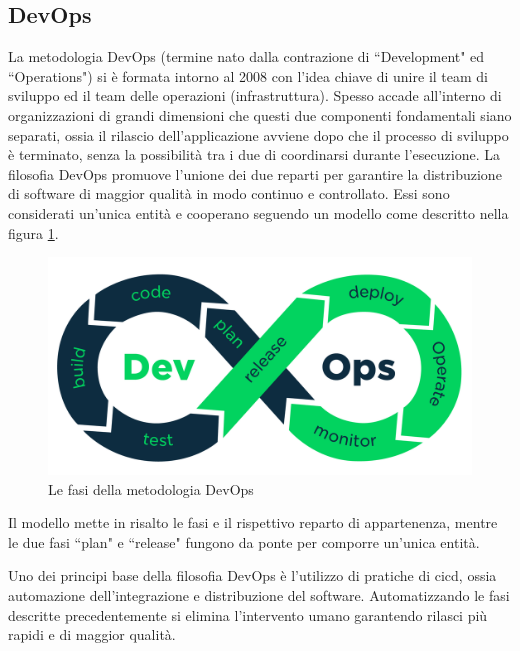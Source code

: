 \subsection{DevOps}
La metodologia DevOps (termine nato dalla contrazione di ``Development" ed ``Operations") si è formata intorno al 2008 con l'idea chiave di unire il team di sviluppo ed il team delle operazioni (infrastruttura). Spesso accade all'interno di organizzazioni di grandi dimensioni che questi due componenti fondamentali siano separati, ossia il rilascio dell'applicazione avviene dopo che il processo di sviluppo è terminato, senza la possibilità tra i due di coordinarsi durante l'esecuzione. La filosofia DevOps promuove l'unione dei due reparti per garantire la distribuzione di software di maggior qualità in modo continuo e controllato. Essi sono considerati un'unica entità e cooperano seguendo un modello come descritto nella figura \ref{fig:devops-process}.
\begin{figure}[htb]
	\centering
	\includegraphics[width=.9\linewidth]{figures/devops-process.png}
	\caption{Le fasi della metodologia DevOps}
	\label{fig:devops-process}
\end{figure}
Il modello mette in risalto le fasi e il rispettivo reparto di appartenenza, mentre le due fasi ``plan" e ``release" fungono da ponte per comporre un'unica entità.

Uno dei principi base della filosofia DevOps è l'utilizzo di pratiche di \ac{cicd}, ossia automazione dell'integrazione e distribuzione del software. Automatizzando le fasi descritte precedentemente si elimina l'intervento umano garantendo rilasci più rapidi e di maggior qualità.

